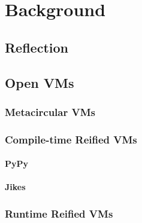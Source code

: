 
\chapter{Background}
\minitoc


\section{Reflection}


\section{Open VMs}

\subsection{Metacircular VMs}


\subsection{Compile-time Reified VMs}
\subsubsection{PyPy}

\subsubsection{Jikes}

\subsection{Runtime Reified VMs}
